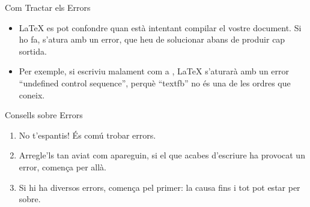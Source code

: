 \begin{frame}[fragile]{Com Tractar els Errors}
\begin{itemize}
\item \LaTeX{} es pot confondre quan està intentant compilar el vostre document. 
    Si ho fa, s'atura amb un error, que heu de solucionar abans de produir cap sortida.
\item Per exemple, si escriviu malament  com a , \LaTeX{} s'aturarà amb un error 
``undefined control sequence'', perquè ``textfb'' no és una de les ordres que coneix.
\end{itemize}
\begin{block}{Consells sobre Errors}
\begin{enumerate}
\item No t'espantis! És comú trobar errors.
\item Arregle'ls tan aviat com apareguin, si el que acabes d'escriure ha provocat un error, comença per allà. 
\item Si hi ha diversos errors, comença pel primer:
la causa fins i tot pot estar per sobre.
\end{enumerate}
\end{block}
\end{frame}


